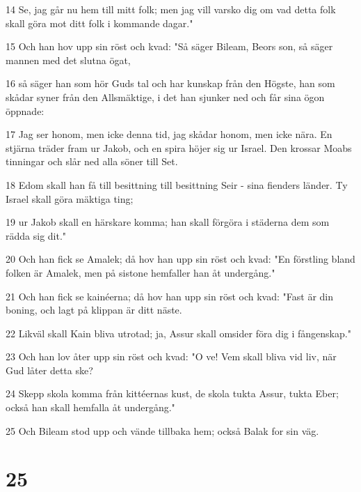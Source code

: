 \par 14 Se, jag går nu hem till mitt folk; men jag vill varsko dig om vad detta folk skall göra mot ditt folk i kommande dagar."
\par 15 Och han hov upp sin röst och kvad: "Så säger Bileam, Beors son, så säger mannen med det slutna ögat,
\par 16 så säger han som hör Guds tal och har kunskap från den Högste, han som skådar syner från den Allsmäktige, i det han sjunker ned och får sina ögon öppnade:
\par 17 Jag ser honom, men icke denna tid, jag skådar honom, men icke nära. En stjärna träder fram ur Jakob, och en spira höjer sig ur Israel. Den krossar Moabs tinningar och slår ned alla söner till Set.
\par 18 Edom skall han få till besittning till besittning Seir - sina fienders länder. Ty Israel skall göra mäktiga ting;
\par 19 ur Jakob skall en härskare komma; han skall förgöra i städerna dem som rädda sig dit."
\par 20 Och han fick se Amalek; då hov han upp sin röst och kvad: "En förstling bland folken är Amalek, men på sistone hemfaller han åt undergång."
\par 21 Och han fick se kainéerna; då hov han upp sin röst och kvad: "Fast är din boning, och lagt på klippan är ditt näste.
\par 22 Likväl skall Kain bliva utrotad; ja, Assur skall omsider föra dig i fångenskap."
\par 23 Och han lov åter upp sin röst och kvad: "O ve! Vem skall bliva vid liv, när Gud låter detta ske?
\par 24 Skepp skola komma från kittéernas kust, de skola tukta Assur, tukta Eber; också han skall hemfalla åt undergång."
\par 25 Och Bileam stod upp och vände tillbaka hem; också Balak for sin väg.

\chapter{25}


